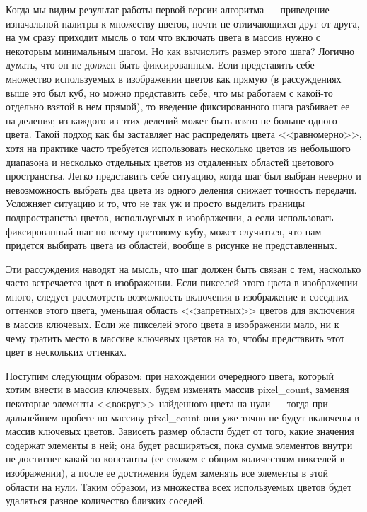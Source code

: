 \documentclass[12pt]{article}
\begin{document}
{	Когда мы видим результат работы первой версии алгоритма --- приведение изначальной палитры к множеству цветов, почти не отличающихся друг от друга, на ум сразу приходит мысль о том что включать цвета в массив нужно с некоторым минимальным шагом. Но как вычислить размер этого шага? Логично думать, что он не должен быть фиксированным. Если представить себе множество используемых в изображении цветов как прямую (в рассуждениях выше это был куб, но можно представить себе, что мы работаем с какой-то отдельно взятой в нем прямой), то введение фиксированного шага разбивает ее на деления; из каждого из этих делений может быть взято не больше одного цвета. Такой подход как бы заставляет нас распределять цвета <<равномерно>>, хотя на практике часто требуется использовать несколько цветов из небольшого диапазона и несколько отдельных цветов из отдаленных областей цветового пространства. Легко представить себе ситуацию, когда шаг был выбран неверно и невозможность выбрать два цвета из одного деления снижает точность передачи. Усложняет ситуацию и то, что не так уж и просто выделить границы подпространства цветов, используемых в изображении, а если использовать фиксированный шаг по всему цветовому кубу, может случиться, что нам придется выбирать цвета из областей, вообще в рисунке не представленных.
	
	Эти рассуждения наводят на мысль, что шаг должен быть связан с тем, насколько часто встречается цвет в изображении. Если пикселей этого цвета в изображении много, следует рассмотреть возможность включения в изображение и соседних оттенков этого цвета, уменьшая область <<запретных>> цветов для включения в массив ключевых. Если же пикселей этого цвета в изображении мало, ни к чему тратить место в массиве ключевых цветов на то, чтобы представить этот цвет в нескольких оттенках. 
	
	Поступим следующим образом: при нахождении очередного цвета, который хотим внести в массив ключевых, будем изменять массив pixel\_count, заменяя некоторые элементы <<вокруг>> найденного цвета на нули --- тогда при дальнейшем пробеге по массиву pixel\_count они уже точно не будут включены в массив ключевых цветов. Зависеть размер области будет от того, какие значения содержат элементы в ней; она будет расширяться, пока сумма элементов внутри не достигнет какой-то константы (ее свяжем с общим количеством пикселей в изображении), а после ее достижения будем заменять все элементы в этой области на нули. Таким образом, из множества всех используемых цветов будет удаляться разное количество близких соседей.
	
}
\end{document}
